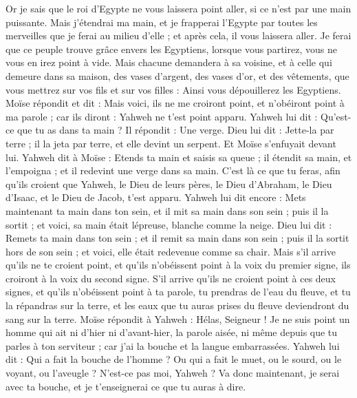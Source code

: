 \begin{multicols}{2}
Or je sais que le roi d'Egypte ne vous laissera point aller, si ce n’est par une main puissante.
Mais j'étendrai ma main, et je frapperai l'Egypte par toutes les merveilles que je ferai au milieu d'elle ; et après cela, il vous laissera aller.
Je ferai que ce peuple trouve grâce envers les Egyptiens, lorsque vous partirez, vous ne vous en irez point à vide.
Mais chacune demandera à sa voisine, et à celle qui demeure dans sa maison, des vases d'argent, des vases d'or, et des vêtements, que vous mettrez sur vos fils et sur vos filles : Ainsi vous dépouillerez les Egyptiens.
\VerseOne{}Moïse répondit et dit : Mais voici, ils ne me croiront point, et n'obéiront point à ma parole ; car ils diront : Yahweh ne t'est point apparu.
Yahweh lui dit : Qu'est-ce que tu as dans ta main ? Il répondit : Une verge.
Dieu lui dit : Jette-la par terre ; il la jeta par terre, et elle devint un serpent. Et Moïse s'enfuyait devant lui.
Yahweh dit à Moïse : Etends ta main et saisis sa queue ; il étendit sa main, et l'empoigna ; et il redevint une verge dans sa main.
C’est là ce que tu feras, afin qu'ils croient que Yahweh, le Dieu de leurs pères, le Dieu d'Abraham, le Dieu d'Isaac, et le Dieu de Jacob, t'est apparu.
Yahweh lui dit encore : Mets maintenant ta main dans ton sein, et il mit sa main dans son sein ; puis il la sortit ; et voici, sa main était lépreuse, blanche comme la neige.
Dieu lui dit : Remets ta main dans ton sein ; et il remit sa main dans son sein ; puis il la sortit hors de son sein ; et voici, elle était redevenue comme sa chair.
Mais s'il arrive qu'ils ne te croient point, et qu'ils n'obéissent point à la voix du premier signe, ils croiront à la voix du second signe.
S'il arrive qu'ils ne croient point à ces deux signes, et qu'ils n'obéissent point à ta parole, tu prendras de l'eau du fleuve, et tu la répandras sur la terre, et les eaux que tu auras prises du fleuve deviendront du sang sur la terre.
Moïse répondit à Yahweh : Hélas, Seigneur ! Je ne suis point un homme qui ait ni d'hier ni d’avant-hier, la parole aisée, ni même depuis que tu parles à ton serviteur ; car j'ai la bouche et la langue embarrassées.
Yahweh lui dit : Qui a fait la bouche de l'homme ? Ou qui a fait le muet, ou le sourd, ou le voyant, ou l'aveugle ? N’est-ce pas moi, Yahweh ?
Va donc maintenant, je serai avec ta bouche, et je t'enseignerai ce que tu auras à dire.

\end{multicols}
